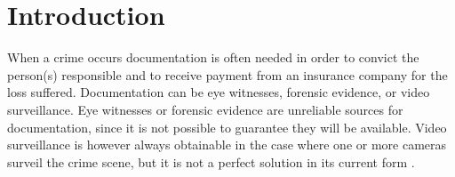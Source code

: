 \chapter{Introduction}
\label{chap:introduction}


When a crime occurs documentation is often needed in order to convict the person(s) responsible and to receive payment from an insurance company for the loss suffered.
Documentation can be eye witnesses, forensic evidence, or video surveillance.
Eye witnesses or forensic evidence are unreliable sources for documentation, since it is not possible to guarantee they will be available.
Video surveillance is however always obtainable in the case where one or more cameras surveil the crime scene, but it is not a perfect solution in its current form \citep{whats-wrong-public-video-surveillance}.








